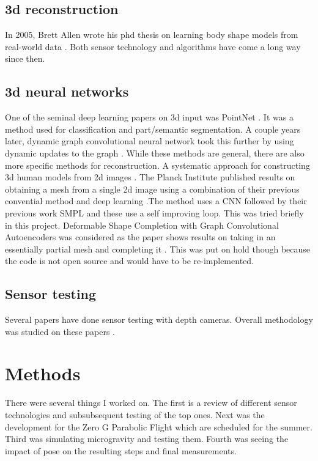 \section{3d reconstruction}
In 2005, Brett Allen wrote his phd thesis on learning body shape models from real-world data \cite{allen2005learning}. Both sensor technology and algorithms have come a long way since then.

\section{3d neural networks}
One of the seminal deep learning papers on 3d input was PointNet \cite{DBLP:journals/corr/QiSMG16}. It was a method used for classification and part/semantic segmentation. A couple years later, dynamic graph convolutional neural network took this further by using dynamic updates to the graph \cite{DBLP:journals/corr/abs-1801-07829}. While these methods are general, there are also more specific methods for reconstruction. A systematic approach for constructing 3d human models from 2d images \cite{5645897}. The Planck Institute published results on obtaining a mesh from a single 2d image using a combination of their previous convential method and deep learning \cite{kolotouros2019learning}.The method uses a CNN followed by their previous work SMPL and these use a self improving loop. This was tried briefly in this project. Deformable Shape Completion with Graph Convolutional Autoencoders was considered as the paper shows results on taking in an essentially partial mesh and completing it \cite{litany2018deformable}. This was put on hold though because the code is not open source and would have to be re-implemented. 

\section{Sensor testing}
Several papers have done sensor testing with depth cameras. Overall methodology was studied on these papers \cite{sophian2017evaluation} \cite{khoshelham2012accuracy} \cite{langmann2012depth} \cite{sankowski2017estimation}.

\chapter{Methods}
There were several things I worked on. The first is a review of different sensor technologies and subsubsequent testing of the top ones. Next was the development for the Zero G Parabolic Flight which are scheduled for the summer. Third was simulating microgravity and testing them. Fourth was seeing the impact of pose on the resulting steps and final measurements.


